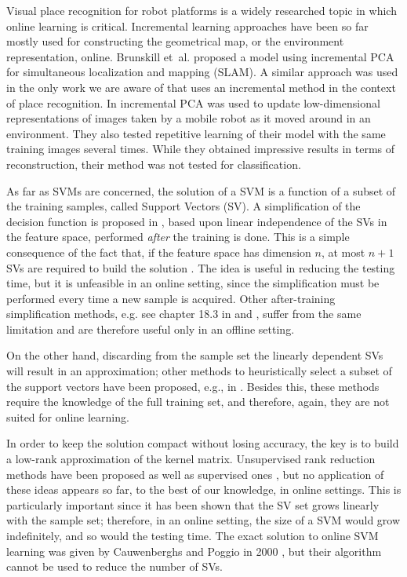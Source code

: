 Visual place recognition for robot platforms is a widely researched
topic in which online learning is critical. Incremental learning
approaches have been so far mostly used for constructing the
geometrical map, or the environment representation, online. Brunskill
et~al. \cite{emma:irca05} proposed a model using incremental PCA for
simultaneous localization and mapping (SLAM). A similar approach was
used in the only work we are aware of that uses an incremental method
in the context of place recognition. In \cite{ljubjiana:icra02}
incremental PCA was used to update low-dimensional representations of
images taken by a mobile robot as it moved around in an
environment. They also tested repetitive learning of their model with
the same training images several times. While they obtained impressive
results in terms of reconstruction, their method was not tested for
classification.

As far as SVMs are concerned, the solution of a SVM is a function of
a subset of the training samples, called Support Vectors (SV). A
simplification of the decision function is proposed in
\cite{DownsGM01}, based upon linear independence of the SVs in the
feature space, performed \emph{after} the training is done. This is a
simple consequence of the fact that, if the feature space has
dimension $n$, at most $n+1$ SVs are required to build the
solution \cite{PontilV98}. The idea is useful in reducing the testing
time, but it is unfeasible in an online setting, since the
simplification must be performed every time a new sample is
acquired. Other after-training simplification methods, e.g. see
chapter 18.3 in \cite{SmolaS02} and \cite{nguyen2005}, suffer
from the same limitation and are therefore useful only in an offline
setting.

On the other hand, discarding from the sample set the linearly
dependent SVs will result in an approximation; other methods to
heuristically select a subset of the support vectors have been
proposed, e.g., in \cite{LeeM01,schoel06,KeerthiCDC06}. Besides this,
these methods require the knowledge of the full training set, and
therefore, again, they are not suited for online learning.

In order to keep the solution compact without losing accuracy, the key
is to build a low-rank approximation of the kernel
matrix. Unsupervised rank reduction methods have been proposed
\cite{Baudat03} as well as supervised ones \cite{BachJordan2005}, but
no application of these ideas appears so far, to the best of our
knowledge, in online settings. This is particularly important since it
has been shown \cite{Steinwart03} that the SV set grows linearly with
the sample set; therefore, in an online setting, the size of a SVM
would grow indefinitely, and so would the testing time. The exact
solution to online SVM learning was given by Cauwenberghs and Poggio
in 2000 \cite{CauwenberghsP00}, but their algorithm cannot be used to
reduce the number of SVs.
